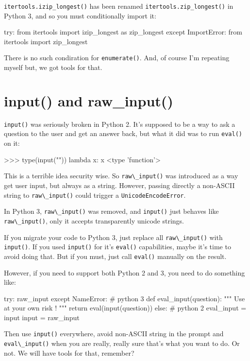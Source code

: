 \lstinline{itertools.izip_longest()} has been renamed \lstinline{itertools.zip_longest()} in Python 3, and so you must conditionally import it:

\begin{py2and3}
try:
    from itertools import izip_longest as zip_longest
except ImportError:
    from itertools import zip_longest
\end{py2and3}

There is no such condiration for \lstinline{enumerate()}. And, of course I'm repeating myself but, we got tools for that.

\section{input() and raw\_input()}

\lstinline{input()} was seriously broken in Python 2. It's supposed to be a way to ask a question to the user and get an answer back, but what it did was to run \lstinline{eval()} on it:

\begin{py2}
>>> type(input(""))
lambda x: x
<type 'function'>
\end{py2}

This is a terrible idea security wise. So \lstinline{raw\_input()} was introduced as a way get user input, but always as a string. However, passing directly a non-ASCII string to \lstinline{raw\_input()} could trigger a \lstinline{UnicodeEncodeError}.

In Python 3, \lstinline{raw\_input()} was removed, and \lstinline{input()} just behaves like \lstinline{raw\_input()}, only it accepts transparently unicode strings.

If you migrate your code to Python 3, just replace all \lstinline{raw\_input()} with \lstinline{input()}. If you used \lstinline{input()} for it's \lstinline{eval()} capabilities, maybe it's time to avoid doing that. But if you must, just call \lstinline{eval()} manually on the result.

However, if you need to support both Python 2 and 3, you need to do something like:

\begin{py2and3}
try:
    raw\_input
except NameError: # python 3
    def eval_input(question):
        """ Use at your own risk ! """
        return eval(input(question))
else: # python 2
    eval_input = input
    input = raw\_input
\end{py2and3}

Then use \lstinline{input()} everywhere, avoid non-ASCII string in the prompt and \lstinline{eval\_input()} when you are really, really sure that's what you want to do. Or not. We will have tools for that, remember?

